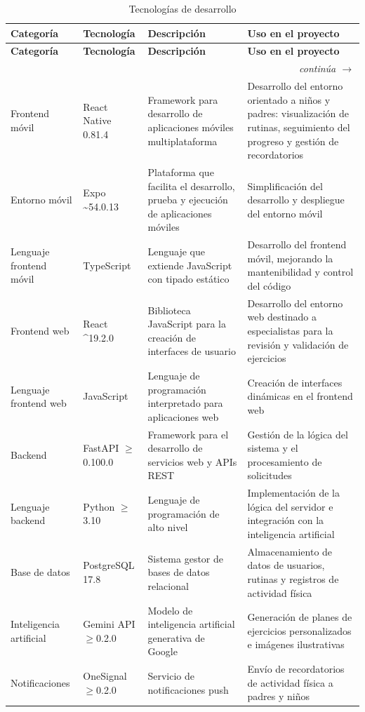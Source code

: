 				\begingroup
				\setlength{\LTpre}{6pt}\setlength{\LTpost}{2pt}
				\renewcommand{\arraystretch}{1.15}
				\small
				\begin{longtable}{p{2.8cm}p{3.3cm}p{3.5cm}p{4.4cm}}
					\caption{Tecnologías de desarrollo}\label{tab:tecnologias}\\
					\hline
					\textbf{Categoría} & \textbf{Tecnología} & \textbf{Descripción} & \textbf{Uso en el proyecto}\\
					\hline
					\endfirsthead
					
					\textbf{Categoría} & \textbf{Tecnología} & \textbf{Descripción} & \textbf{Uso en el proyecto}\\
					
					\endhead
					\multicolumn{4}{r}{\footnotesize\itshape continúa $\rightarrow$}\\
					\endfoot
					
					\endlastfoot
					Frontend móvil & React Native 0.81.4 & Framework para desarrollo de aplicaciones móviles multiplataforma & Desarrollo del entorno orientado a niños y padres: visualización de rutinas, seguimiento del progreso y gestión de recordatorios\\
					Entorno móvil & Expo \textasciitilde{}54.0.13 & Plataforma que facilita el desarrollo, prueba y ejecución de aplicaciones móviles & Simplificación del desarrollo y despliegue del entorno móvil\\
					Lenguaje frontend móvil & TypeScript & Lenguaje que extiende JavaScript con tipado estático & Desarrollo del frontend móvil, mejorando la mantenibilidad y control del código\\
					Frontend web & React \^{}19.2.0 & Biblioteca JavaScript para la creación de interfaces de usuario & Desarrollo del entorno web destinado a especialistas para la revisión y validación de ejercicios\\
					Lenguaje frontend web & JavaScript & Lenguaje de programación interpretado para aplicaciones web & Creación de interfaces dinámicas en el frontend web\\
					Backend & FastAPI $\geq$0.100.0 & Framework para el desarrollo de servicios web y APIs REST & Gestión de la lógica del sistema y el procesamiento de solicitudes\\
					Lenguaje backend & Python $\geq$3.10 & Lenguaje de programación de alto nivel & Implementación de la lógica del servidor e integración con la inteligencia artificial\\
					Base de datos & PostgreSQL 17.8 & Sistema gestor de bases de datos relacional & Almacenamiento de datos de usuarios, rutinas y registros de actividad física\\
					Inteligencia artificial & Gemini API $\geq$0.2.0 & Modelo de inteligencia artificial generativa de Google & Generación de planes de ejercicios personalizados e imágenes ilustrativas\\
					Notificaciones & OneSignal $\geq$0.2.0 & Servicio de notificaciones push & Envío de recordatorios de actividad física a padres y niños\\
				\end{longtable}
				\vspace{12pt}
				\tblnote
				\endgroup
				
